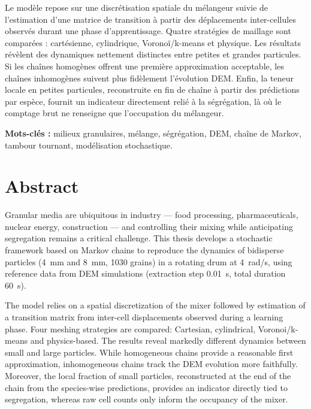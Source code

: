 \documentclass[french]{MemoireMaster}
\begin{document}
\noindent
Le modèle repose sur une discrétisation spatiale du mélangeur suivie de l'estimation d'une matrice de transition à partir des déplacements inter-cellules observés durant une phase d'apprentissage. Quatre stratégies de maillage sont comparées : cartésienne, cylindrique, Voronoï/k-means et physique. Les résultats révèlent des dynamiques nettement distinctes entre petites et grandes particules. Si les chaînes homogènes offrent une première approximation acceptable, les chaînes inhomogènes suivent plus fidèlement l'évolution DEM. Enfin, la teneur locale en petites particules, reconstruite en fin de chaîne à partir des prédictions par espèce, fournit un indicateur directement relié à la ségrégation, là où le comptage brut ne renseigne que l'occupation du mélangeur.

\vspace{0.5cm}
\noindent
\textbf{Mots-clés :} milieux granulaires, mélange, ségrégation, DEM, chaîne de Markov, tambour tournant, modélisation stochastique.

\clearpage

\section*{Abstract}

\noindent
Granular media are ubiquitous in industry --- food processing, pharmaceuticals, nuclear energy, construction --- and controlling their mixing while anticipating segregation remains a critical challenge. This thesis develops a stochastic framework based on Markov chains to reproduce the dynamics of bidisperse particles (\SI{4}{mm} and \SI{8}{mm}, 1030 grains) in a rotating drum at \SI{4}{rad/s}, using reference data from DEM simulations (extraction step \SI{0.01}{s}, total duration \SI{60}{s}).

\noindent
The model relies on a spatial discretization of the mixer followed by estimation of a transition matrix from inter-cell displacements observed during a learning phase. Four meshing strategies are compared: Cartesian, cylindrical, Voronoi/k-means and physics-based. The results reveal markedly different dynamics between small and large particles. While homogeneous chains provide a reasonable first approximation, inhomogeneous chains track the DEM evolution more faithfully. Moreover, the local fraction of small particles, reconstructed at the end of the chain from the species-wise predictions, provides an indicator directly tied to segregation, whereas raw cell counts only inform the occupancy of the mixer.
\end{document}
